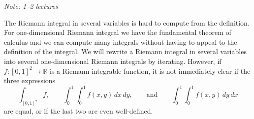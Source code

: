 \documentclass[12pt]{book}
\newcommand{\R}{{\mathbb{R}}}
\newcommand{\sectionnotes}[1]{\noindent \emph{Note: #1} \medskip \par}
\theoremstyle{plain}
\theoremstyle{remark}
\theoremstyle{definition}
\theoremstyle{exercise}
\theoremstyle{example}
\begin{document}
\sectionnotes{1--2 lectures}

The Riemann integral in several variables
is hard to compute from the definition.
For one-dimensional Riemann integral we have the fundamental
theorem of calculus
and we can compute many integrals without
having to appeal to the definition of the integral.
We will rewrite 
a Riemann integral in several variables into
several one-dimensional Riemann integrals
by iterating.  However, if $f \colon [0,1]^2 \to \R$ is a Riemann integrable
function, it is not immediately clear if the three expressions
\begin{equation*}
\int_{[0,1]^2} f ,
\qquad
\int_0^1 \int_0^1 f(x,y) \, dx \, dy ,
\qquad \text{and}
\qquad
\int_0^1 \int_0^1 f(x,y) \, dy \, dx
\end{equation*}
are equal, or if the last two are even well-defined.
\end{document}
